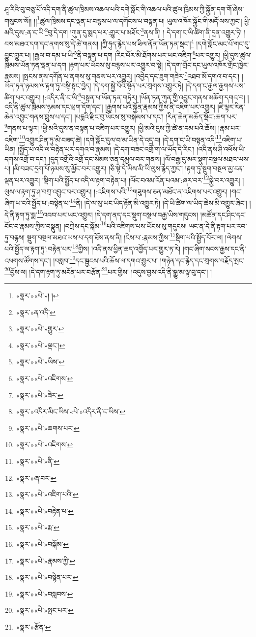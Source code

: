 ཤཱ་རིའི་བུ་བཅུ་པོ་འདི་དག་ནི་ཚུལ་ཁྲིམས་འཆལ་པའི་དགེ་སློང་གི་འཆལ་པའི་ཚུལ་ཁྲིམས་ཀྱི་སྐྱོན་དག་གོ་ཞེས་གསུངས་སོ།། །།\footnote{«སྣར་»«པེ་»། །}ཚུལ་ཁྲིམས་དང་ལྡན་པ་བརྙས་པ་ལ་དགོངས་པ་བསྟན་པ། ཡུལ་འཁོར་སྐྱོང་གི་མདོ་ལས་ཀྱང་། ཕྱི་མའི་དུས་:ན་ང་ཡི་\footnote{«སྣར་»ན་འདི་}བུ་དེ་དག །ཀུན་དུ་སྨད་པར་:གྱུར་པ་མཐོང་\footnote{«སྣར་»«པེ་»གྱུར་}ནས་ནི། །
དེ་དག་ང་ཡི་ཚིག་ནི་དྲན་འགྱུར་ཏེ། །བས་མཐའ་དག་དང་ནགས་སུ་དེ་ཚེ་གནས། །ཀྱི་ཧུད་རྙེད་པས་ཟིལ་ནོན་ཡོན་ཏན་སྡང་།\footnote{«སྣར་»«པེ་»ལྡང་།} །དགེ་སློང་མང་པོ་གང་དུ་བྱུང་གྱུར་པ། །རྒྱལ་བ་དམ་པ་ཡི་\footnote{«སྣར་»«པེ་»ཡིས་}ནི་བསྟན་པ་དག །རིང་པོར་མི་ཐོགས་པར་ཡང་འཇིག་\footnote{«སྣར་»«པེ་»འཇིགས་}པར་འགྱུར། །ཕྱི་དུས་ཚུལ་ཁྲིམས་ཡོན་ཏན་ལྡན་པ་དག །རྟག་པར་ཡོངས་སུ་བརྙས་པར་འགྱུར་བ་སྟེ། །དེ་དག་གྲོང་དང་ཡུལ་འཁོར་གྲོང་ཁྱེར་རྣམས། །སྤངས་ནས་དགོན་པ་ནགས་སུ་གནས་པར་འགྱུར། །འབྱེད་དང་ཟུག་གཟེར་\footnote{«སྣར་»«པེ་»ཟེར་}འཐབ་མོ་དགའ་བ་དང་། །ཡོན་ཏན་ཉམས་ལ་རྟག་ཏུ་བསྟི་སྟང་བྱེད། །དེ་དག་སྐྱེ་བོའི་སྟོན་པར་གྲགས་འགྱུར་ཏེ། །དེ་དག་ང་རྒྱལ་རྒྱགས་པས་ཚིག་པར་འགྱུར། །:འདིར་ནི་ང་ཡི་\footnote{«སྣར་»འདིར་མིང་ཡིས་«པེ་»འདིར་ནི་ང་ཡིས་}བསྟན་པ་ཡོན་ཏན་གཏེར། །ཡོན་ཏན་ཀུན་གྱི་འབྱུང་གནས་མཆོག་དགའ་བ། །འདི་ནི་ཚུལ་ཁྲིམས་ཉམས་དང་ཕྲག་དོག་དང་། །རྒྱགས་པའི་སྐྱོན་རྣམས་ཀྱིས་ནི་འཇིག་པར་འགྱུར། །ཇི་ལྟར་རིན་ཆེན་འབྱུང་གནས་བྲུས་པ་དང་། །པདྨའི་རྫིང་བུ་ཡོངས་སུ་བསྐམས་པ་དང་། །རིན་ཆེན་མཆོད་སྡོང་:ཆག་པར་\footnote{«སྣར་»«པེ་»ཆགས་པར་}གནས་པ་ལྟར། །ཕྱི་མའི་དུས་ན་བསྟན་པ་འཇིག་པར་འགྱུར། །ཕྱི་མའི་དུས་ཀྱི་ཚེ་ན་དམ་པའི་ཆོས། །རྣམ་པར་འཇིག་\footnote{«སྣར་»«པེ་»འཇིགས་}འགྱུར་ཤིན་ཏུ་མི་བཟད་ཚེ། །དགེ་སློང་དུལ་བ་མ་ཡིན་དེ་འདྲ་བ། །དེ་དག་ང་ཡི་བསྟན་འདི་\footnote{«སྣར་»«པེ་»ནི་}འཇིག་པ་ཡིན། །སྤྱོད་པ་འདི་ལ་བརྟེན་པར་དགའ་བ་རྣམས། །དེ་དག་བཟང་འགྲོ་ག་ལ་ཡོད་དེ་རིང་། །འདི་ནས་ཤི་འཕོས་ཡི་དགས་འགྲོ་བ་དང་། །དུད་འགྲོའི་འགྲོ་དང་སེམས་ཅན་དམྱལ་བར་གནས། །ལོ་བརྒྱ་དུ་མར་སྡུག་བསྔལ་མཐའ་ཡས་པ། །མི་བཟང་དྲག་པོ་ཉམས་སུ་མྱོང་བར་འགྱུར། །ཅི་སྟེ་དེ་ཡིས་མི་ཡི་ལུས་རྙེད་ཀྱང་། །རྟག་ཏུ་སྡུག་བསྔལ་མྱ་ངན་ལྡན་པར་འགྱུར། །སྡིག་པའི་སྤྱོད་པ་འདི་ལ་རྟག་བརྟེན་པ། །ལོང་བའམ་འོན་པའམ་:ཞར་བར་\footnote{«སྣར་»ཞ་བར་}སྐྱེ་བར་འགྱུར། །ལུས་ལ་རྟག་ཏུ་ཤ་བཀྲ་འབྱུང་བར་འགྱུར། །:འཇིགས་པའི་\footnote{«སྣར་»«པེ་»འཇིག་པའི་}གཟུགས་ཅན་མཐོང་ན་འཇིགས་པར་འགྱུར། །གང་ཞིག་ཡ་ངའི་སྤྱོད་པ་:བསྟེན་པ་\footnote{«སྣར་»«པེ་»བརྟེན་པ་}ནི། །དེ་ལ་སུ་ཡང་ཡིད་རྟོན་མི་འགྱུར་ཏེ། །དེ་ཡི་ཚིག་ལ་ཡིད་ཆེས་མི་འགྱུར་ཞིང་། །དེ་ནི་རྟག་ཏུ་སྨ་\footnote{«སྣར་»«པེ་»རྨ་}འབབ་པར་ཡང་འགྱུར། །དེ་དག་ནད་དང་སྡུག་བསྔལ་བརྒྱ་ཡིས་གདུངས། །མཚོན་དང་ཤིང་དང་བོང་བ་རྣམས་ཀྱིས་བསྣུན། །བཀྲེས་དང་སྐོམ་\footnote{«སྣར་»«པེ་»བསྐོམ་}པའི་འཇིགས་པས་ཡོངས་སུ་གདུངས། ཡང་ན་དེ་ནི་རྟག་པར་རབ་ཏུ་བརྙས། སྡུག་བསྔལ་མཐའ་ཡས་པ་དག་ཐོས་ནས་ནི། །ངེས་པ་:རྣམས་ཀྱིས་\footnote{«སྣར་»«པེ་»རྣམས་ཀྱི་}སྡིག་པའི་སྤྱོད་བོར་ལ། །ལེགས་པའི་སྤྱོད་ལ་རྟག་ཏུ་:བརྟེན་པར་\footnote{«སྣར་»«པེ་»བསྙེན་པར་}གྱིས། །འདི་ནས་ཕྱིན་ཆད་འགྱོད་པར་གྱུར་ཏ་རེ། །གང་ཞིག་སངས་རྒྱས་དང་ནི་འཕགས་ཚོགས་དང་། །བསླབ་\footnote{«སྣར་»«པེ་»བསླབས་}དང་སྦྱངས་པའི་ཆོས་ལ་དགའ་གྱུར་པ། །གཉེན་དང་རྙེད་དང་གྲགས་བརྗོད་སྤང་\footnote{«སྣར་»«པེ་»སྤང་པར་}བྱོས་ལ། །དེ་དག་རྟག་ཏུ་མངོན་པར་བརྩོན་\footnote{«སྣར་»རྩོན་}པར་གྱིས། །འདུས་བྱས་འདི་ནི་སྒྱུ་མ་ལྟ་བུ་དང་། །
